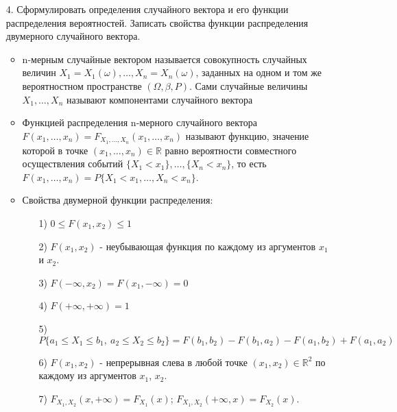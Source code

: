 \documentclass[a4paper]{article}
\begin{document}
\begin{enumerate}
\item[4.] Сформулировать определения случайного вектора и его функции распределения вероятностей. Записать свойства функции распределения двумерного случайного вектора.
\begin{itemize}
\item n-мерным случайные вектором называется совокупность случайных величин $X_1 = X_1(\omega), \ldots, X_n = X_n(\omega)$, заданных на одном и том же вероятностном пространстве $(\Omega, \beta, P)$. Сами случайные величины $X_1, \ldots, X_n$ называют компонентами случайного вектора
\item Функцией распределения n-мерного случайного вектора $F(x_1, \ldots, x_n) = F_{X_1, \ldots, X_n} (x_1, \ldots, x_n)$ называют функцию, значение которой в точке $(x_1, \ldots, x_n) \in \mathbb{R}$ равно вероятности совместного осуществления событий $\{X_1 < x_1\}, \ldots, \{X_n < x_n\}$, то есть $F(x_1, \ldots, x_n) = P\{X_1 < x_1, \ldots, X_n < x_n\}$.
\item Свойства двумерной функции распределения:
	\begin{enumerate}
	\item[1)] $0 \leqslant F(x_1, x_2) \leqslant 1$
	\item[2)] $F(x_1, x_2)$ - неубывающая функция по каждому из аргументов $x_1$ и $x_2$.
	\item[3)] $F(-\infty, x_2) = F(x_1, -\infty) = 0$
	\item[4)] $F(+\infty, +\infty) = 1$ %
	\item[5)] $P\{a_1 \leqslant X_1 \leqslant b_1, \ a_2 \leqslant X_2 \leqslant b_2\} = F(b_1, b_2) - F(b_1, a_2) - F(a_1, b_2) + F(a_1, a_2)$
	\item[6)] $F(x_1, x_2)$ - непрерывная слева в любой точке $(x_1, x_2) \in \mathbb{R}^2$ по каждому из аргументов $x_1$, $x_2$.
	\item[7)] $F_{X_1,X_2} (x, +\infty) = F_{X_1}(x)$; $F_{X_1,X_2}(+\infty, x) = F_{X_2}(x)$.
	\end{enumerate}
\end{itemize}



\end{enumerate}
\end{document}
